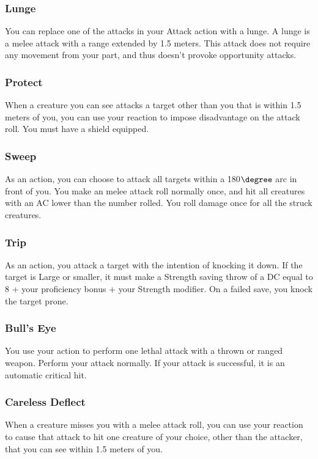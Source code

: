 \subsubsection{Lunge} \label{tec::lunge}
You can replace one of the attacks in your Attack action with a lunge.
A lunge is a melee attack with a range extended by 1.5 meters.
This attack does not require any movement from your part, and thus doesn't provoke opportunity attacks.

\subsubsection{Protect} \label{tec::protect}
When a creature you can see attacks a target other than you that is within 1.5 meters of you, you can use your reaction to impose disadvantage on the attack roll.
You must have a shield equipped.

\subsubsection{Sweep} \label{tec::sweep}
As an action, you can choose to attack all targets within a 180$\degree$ arc in front of you.
You make an melee attack roll normally once, and hit all creatures with an AC lower than the number rolled.
You roll damage once for all the struck creatures.

\subsubsection{Trip} \label{tec::trip}
As an action, you attack a target with the intention of knocking it down.
If the target is Large or smaller, it must make a Strength saving throw of a DC equal to 8 + your proficiency bonus + your Strength modifier.
On a failed save, you knock the target prone.

\subsubsection{Bull's Eye} \label{tec::bullseye}
You use your action to perform one lethal attack with a thrown or ranged weapon.
Perform your attack normally.
If your attack is successful, it is an automatic critical hit.

\subsubsection{Careless Deflect} \label{tec::carelessdeflect}
When a creature misses you with a melee attack roll, you can use your reaction to cause that attack to hit one creature of your choice, other than the attacker, that you can see within 1.5 meters of you.

